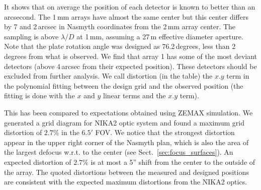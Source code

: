 It shows that on average the position of each detector is known to better than
an arcsecond. The 1\,mm arrays have almost the same center but this center
differs by 7 and 2\,arcsec in Nasmyth coordinates from the
2\,mm array center. The sampling is above
$\lambda/D$ at 1\,mm, assuming a 27\,m effective diameter aperture. Note that
the plate rotation angle was designed as 76.2\,degrees, less than 2
degrees from what is observed. We find that array 1
has some of the most deviant detectors (above 4\,arcsec from their expected
position). These detectors should be excluded from further analysis. We call
distortion (in the table) the $x.y$ term in the polynomial fitting between the
design grid and the observed position (the fitting is done with the $x$ and
$y$ linear terms and the $x.y$ term). 

This has been compared to expectations obtained using ZEMAX
simulation. 
%
%
%
%
We generated a grid diagram for NIKA2 optic system and found a maximum
grid distortion of $2.7\%$ in the $6.5'$ FOV. We notice that the
strongest distortion appear in the upper right corner of the Nasmyth plan, which is
also the area of the largest defocus w.r.t. to the center (see
Sect.~\ref{sec:focus_surfaces}).
An expected distortion of $2.7\%$ is at most a 5'' shift from the
center to the outside of the array. The quoted distortions between the
measured and designed positions are consistent with the expected
maximum distortions from the NIKA2 optics.

